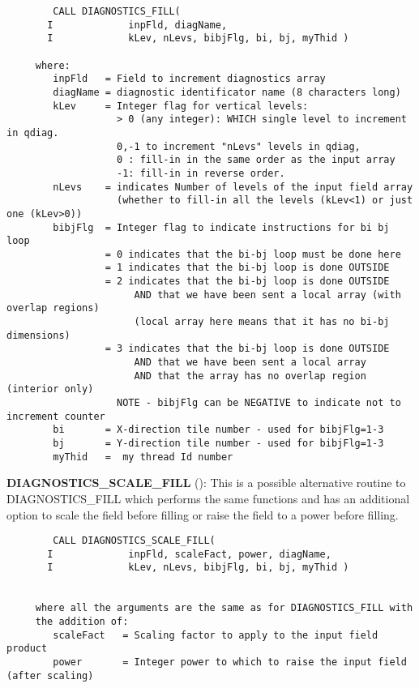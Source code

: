 \begin{verbatim}
        CALL DIAGNOSTICS_FILL(
       I             inpFld, diagName,
       I             kLev, nLevs, bibjFlg, bi, bj, myThid )

     where:
        inpFld   = Field to increment diagnostics array
        diagName = diagnostic identificator name (8 characters long)
        kLev     = Integer flag for vertical levels:
                   > 0 (any integer): WHICH single level to increment in qdiag.
                   0,-1 to increment "nLevs" levels in qdiag,
                   0 : fill-in in the same order as the input array
                   -1: fill-in in reverse order.
        nLevs    = indicates Number of levels of the input field array
                   (whether to fill-in all the levels (kLev<1) or just one (kLev>0))
        bibjFlg  = Integer flag to indicate instructions for bi bj loop
                 = 0 indicates that the bi-bj loop must be done here
                 = 1 indicates that the bi-bj loop is done OUTSIDE
                 = 2 indicates that the bi-bj loop is done OUTSIDE
                      AND that we have been sent a local array (with overlap regions)
                      (local array here means that it has no bi-bj dimensions)
                 = 3 indicates that the bi-bj loop is done OUTSIDE
                      AND that we have been sent a local array
                      AND that the array has no overlap region (interior only)
                   NOTE - bibjFlg can be NEGATIVE to indicate not to increment counter
        bi       = X-direction tile number - used for bibjFlg=1-3
        bj       = Y-direction tile number - used for bibjFlg=1-3
        myThid   =  my thread Id number
\end{verbatim}

\noindent
{\bf DIAGNOSTICS\_SCALE\_FILL}
():
This is a possible alternative routine to
DIAGNOSTICS\_FILL which performs the same functions and has an additional option
to scale the field before filling or raise the field to a power before filling.

\begin{verbatim}
        CALL DIAGNOSTICS_SCALE_FILL(
       I             inpFld, scaleFact, power, diagName,
       I             kLev, nLevs, bibjFlg, bi, bj, myThid )


     where all the arguments are the same as for DIAGNOSTICS_FILL with
     the addition of:
        scaleFact   = Scaling factor to apply to the input field product
        power       = Integer power to which to raise the input field (after scaling)
\end{verbatim}

